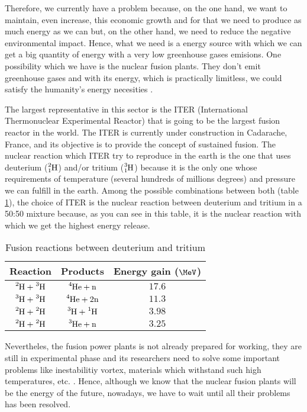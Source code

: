 Therefore, we currently have a problem because, on the one hand, we want to maintain, even increase, this economic growth and for that we need to produce as much energy as we can but, on the other hand, we need to reduce the negative environmental impact. Hence, what we need is a energy source with which we can get a big quantity of energy with a very low greenhouse gases emisions. One possibility which we have is the nuclear fusion plants. They don't emit greenhouse gases and with its energy, which is practically limitless, we could satisfy the humanity's energy necesities .

The largest representative in this sector is the ITER \cite{ITER} (International Thermonuclear Experimental Reactor) that is going to be the largest fusion reactor in the world. The ITER is currently under construction in Cadarache, France, and its objective is to provide the concept of sustained fusion. The nuclear reaction which ITER try to reproduce in the earth is the one that uses deuterium ($\ce{^{2}_{1}H}$) and/or tritium ($\ce{^{3}_{1}H}$) because it is the only one whose requirements of temperature (several hundreds of millions degrees) and pressure we can fulfill in the earth. Among the possible combinations between both (table \ref{tab:FusionReactions}), the choice of ITER is the nuclear reaction between deuterium and tritium in a 50:50 mixture because, as you can see in this table,  it is the nuclear reaction with which we get the highest energy release. 

\begin{table}[htbp]
\begin{center}
\begin{tabular}{|c|c|c|}
\hline
Reaction & Products & Energy gain ($\MeV$) \\
\hline \hline \hline
$\ce{^{2}H}+\ce{^{3}H}$ & $\ce{^{4}He}+\ce{n}$ & $17.6$ \\ \hline
$\ce{^{3}H}+\ce{^{3}H}$ & $\ce{^{4}He}+2\ce{n}$ & $11.3$ \\ \hline
$\ce{^{2}H}+\ce{^{2}H}$ & $\ce{^{3}H}+\ce{^{1}H}$ & $3.98$ \\ \hline
$\ce{^{2}H}+\ce{^{2}H}$ & $\ce{^{3}He}+\ce{n}$ & $3.25$ \\ \hline
\end{tabular}
\caption{Fusion reactions between deuterium and tritium\cite{TritiumDocument}}
\label{tab:FusionReactions}
\end{center}
\end{table}

Nevertheles, the fusion power plants is not already prepared for working,  they are still in experimental phase and its researchers need to solve some important problems like inestabilitiy vortex, materials which withstand such high temperatures, etc. \cite{FusionCourse}. Hence, although we know that the nuclear fusion plants will be the energy of the future, nowadays, we have to wait until all their problems has been resolved.


